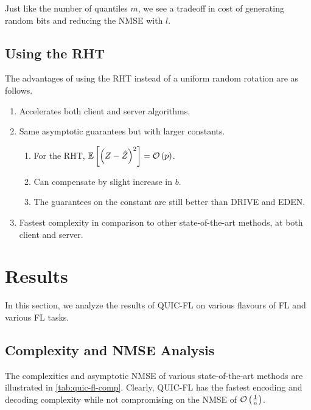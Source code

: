 \documentclass[journal,12pt,twocolumn]{IEEEtran}
\begin{document}
Just like the number of quantiles \(m\), we see a tradeoff in cost of generating
random bits and reducing the NMSE with \(l\).

\subsection{Using the RHT}
\label{ssec:quicfl-rht}
The advantages of using the RHT instead of a uniform random rotation are as
follows.
\begin{enumerate}
    \item Accelerates both client and server algorithms.
    \item Same asymptotic guarantees but with larger constants. 
    \begin{enumerate}
        \item For the RHT, \(\mathbb{E}\left[ \left(Z-\hat{Z}\right)^2 \right] = \mathcal O\left(p\right)\).
        \item Can compensate by slight increase in \(b\).
        \item The guarantees on the constant are still better than DRIVE
        and EDEN.
    \end{enumerate}
    \item Fastest complexity in comparison to other state-of-the-art
    methods, at both client and server.
\end{enumerate}

\section{Results}
\label{sec:res}
In this section, we analyze the results of QUIC-FL on various flavours of FL and
various FL tasks.

\subsection{Complexity and NMSE Analysis}
\label{ssec:res-comp}
The complexities and asymptotic NMSE of various state-of-the-art methods are
illustrated in \autoref{tab:quic-fl-comp}. Clearly, QUIC-FL has the fastest
encoding and decoding complexity while not compromising on the NMSE of
\(\mathcal O\left(\frac{1}{n}\right)\).
\end{document}
